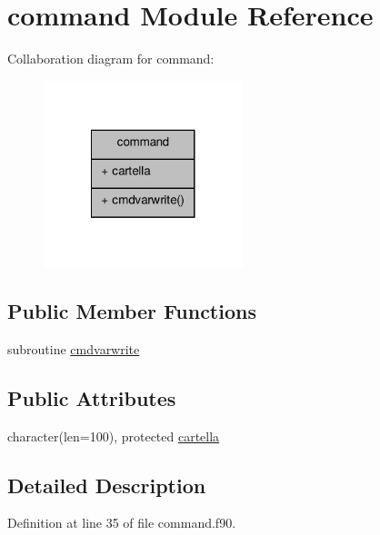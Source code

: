\hypertarget{classcommand}{\section{command Module Reference}
\label{classcommand}
}


Collaboration diagram for command\-:
\nopagebreak
\begin{figure}[H]
\begin{center}
\leavevmode
\includegraphics[width=164pt]{classcommand__coll__graph}
\end{center}
\end{figure}
\subsection*{Public Member Functions}
\begin{DoxyCompactItemize}
\item 
subroutine \hyperlink{classcommand_a60af514b101e4bce27774827c2e01d98}{cmdvarwrite}
\end{DoxyCompactItemize}
\subsection*{Public Attributes}
\begin{DoxyCompactItemize}
\item 
character(len=100), protected \hyperlink{classcommand_a9d30c51dc250367fe88e8ab6c70e3e81}{cartella}
\end{DoxyCompactItemize}


\subsection{Detailed Description}


Definition at line 35 of file command.\-f90.



